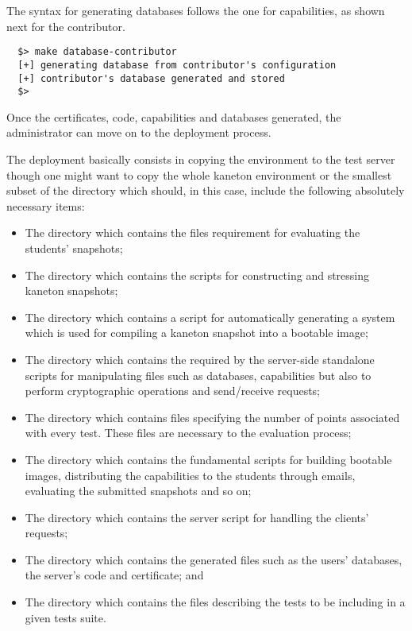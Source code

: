 The syntax for generating databases follows the one for capabilities, as
shown next for the contributor.

\begin{verbatim}
  $> make database-contributor
  [+] generating database from contributor's configuration
  [+] contributor's database generated and stored
  $> 
\end{verbatim}

Once the certificates, code, capabilities and databases generated, the
administrator can move on to the deployment process.


The deployment basically consists in copying the  environment
to the test server though one might want to copy the whole kaneton environment
or the smallest subset of the  directory which should, in this
case, include the following absolutely necessary items:

\begin{itemize}
  \item
    The  directory which contains the files requirement
    for evaluating the students' snapshots;
  \item
    The  directory which contains the scripts for
    constructing and stressing kaneton snapshots;
  \item
    The  directory which contains a script for
    automatically generating a  system which is used
    for compiling a kaneton snapshot into a bootable image;
  \item
    The  directory which contains the  required by the server-side standalone scripts
    for manipulating files such as databases, capabilities \etc{} but also
    to perform cryptographic operations and send/receive 
    requests;
  \item
    The  directory which contains files specifying
    the number of points associated with every test. These files are necessary
    to the evaluation process;
  \item
    The  directory which contains the fundamental
    scripts for building bootable images, distributing the capabilities to
    the students through emails, evaluating the submitted snapshots and so on;
  \item
    The  directory which contains the server script
    for handling the clients' requests;
  \item
    The  directory which contains the generated files
    such as the users' databases, the server's code and certificate; and
  \item
    The  directory which contains the files describing
    the tests to be including in a given tests suite.
\end{itemize}

